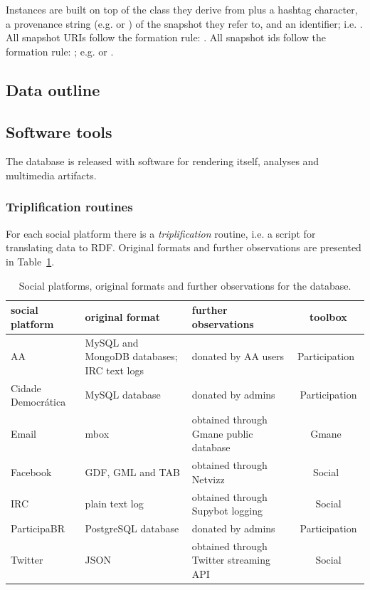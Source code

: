 Instances are built on top of the class they derive from plus a hashtag character,
a provenance string (e.g.  or
) of the snapshot they refer to, and an identifier;
i.e. .
All snapshot URIs follow the formation rule: .
All snapshot ids follow the formation rule: ; e.g.
 or
.

\subsection{Data outline}




\subsection{Software tools}
The database is released with software for rendering itself, analyses and
multimedia artifacts.
\subsubsection{Triplification routines}
For each social platform there is a \emph{triplification} routine,
i.e. a script for translating data to RDF.
Original formats and further observations are presented in
Table~\ref{tab:provenance}.
\begin{table}[h!]\scriptsize
	\begin{center}
		\caption{Social platforms, original formats and further observations for
		the database.}\label{tab:provenance}
		\begin{tabular}{| l || p{3cm} | p{3cm} | c |}\hline
			\textbf{social platform} & \textbf{original format} & \textbf{further observations} & \textbf{toolbox} \\\hline\hline
				AA & MySQL and MongoDB databases; IRC text logs & donated by AA users & Participation~\cite{participation} \\\hline
				    Cidade Democrática & MySQL database & donated by admins & Participation \\\hline
					Email & mbox & obtained through Gmane public database & Gmane~\cite{gmane} \\\hline
					    Facebook & GDF, GML and TAB & obtained through Netvizz~\cite{netvizz} & Social~\cite{social} \\\hline
						IRC & plain text log & obtained through Supybot logging & Social \\\hline
						    ParticipaBR & PostgreSQL database & donated by admins & Participation \\\hline
							Twitter & JSON & obtained through Twitter streaming API & Social \\\hline
		\end{tabular}\end{center}
	\end{table}                    
